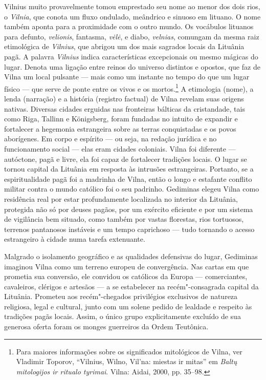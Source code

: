 Vilnius muito provavelmente tomou emprestado seu nome ao menor dos dois
rios, o \textit{Vilnia}, que conota um fluxo ondulado, meândrico e sinuoso
em lituano. O nome também aponta para a proximidade com o outro mundo.
Os vocábulos lituanos para defunto, \textit{velionis}, fantasma, \textit{vėlė}, 
e diabo, \textit{velnias}, comungam da mesma raiz
etimológica de \textit{Vilnius}, que abrigou um dos mais sagrados locais da
Lituânia pagã. A palavra \textit{Vilnius} indica características excepcionais ou
mesmo mágicas do lugar. Denota uma ligação entre reinos do universo
distintos e opostos, que faz de Vilna um local pulsante --- mais como um
instante no tempo do que um lugar físico --- que serve de ponte entre os
vivos e os mortos.\footnote{Para maiores informações sobre os significados mitológicos de Vilna, ver Vladimir Toporov, ``Vilnius, Wilno, Vil'na: miestas ir mitas'' em \textit{Baltų mitologijos ir ritualo tyrimai}. Vilna: Aidai, 2000, pp. 35--98.}
A etimologia (nome), a lenda (narração) e a história (registro factual)
de Vilna revelam suas origens nativas. Diversas cidades erguidas nas
fronteiras bálticas da cristandade, tais como Riga, Tallinn e
Königsberg, foram fundadas no intuito de expandir e fortalecer a
hegemonia estrangeira sobre as terras conquistadas e os povos
aborígenes. Em corpo e espírito --- ou seja, na redação jurídica e no
funcionamento social --- elas eram cidades coloniais. Vilna foi diferente
--- autóctone, pagã e livre, ela foi capaz de fortalecer tradições locais.
O lugar se tornou capital da Lituânia em resposta às intrusões
estrangeiras. Portanto, se a espiritualidade pagã foi a madrinha de
Vilna, então o longo e estafante conflito militar contra o mundo
católico foi o seu padrinho. Gediminas elegeu Vilna como residência real
por estar profundamente localizada no interior da Lituânia, protegida
não só por deuses pagãos, por um exército eficiente e por um sistema de
vigilância bem situado, como também por vastas florestas, rios
tortuosos, terrenos pantanosos instáveis e um tempo caprichoso --- tudo
tornando o acesso estrangeiro à cidade numa tarefa extenuante.

%

Malgrado o isolamento geográfico e as qualidades defensivas do lugar,
Gediminas imaginou Vilna como um terreno europeu de convergência. Nas
cartas em que prometia sua conversão, ele convidou os católicos da
Europa --- comerciantes, cavaleiros, clérigos e artesãos --- a se
estabelecer na recém"-consagrada capital da Lituânia. Prometeu aos
recém"-chegados privilégios exclusivos de natureza religiosa, legal e
cultural, junto com um solene pedido de lealdade e respeito às tradições
pagãs locais. Assim, o único grupo explicitamente excluído de sua
generosa oferta foram os monges guerreiros da Ordem Teutônica.

